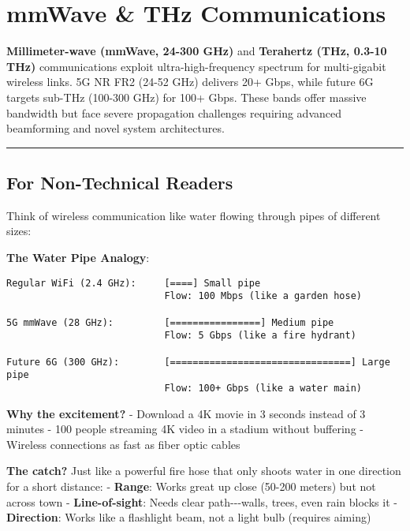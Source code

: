\section{mmWave \& THz Communications}\label{mmwave-thz-communications}

\textbf{Millimeter-wave (mmWave, 24-300 GHz)} and \textbf{Terahertz
(THz, 0.3-10 THz)} communications exploit ultra-high-frequency spectrum
for multi-gigabit wireless links. 5G NR FR2 (24-52 GHz) delivers 20+
Gbps, while future 6G targets sub-THz (100-300 GHz) for 100+ Gbps. These
bands offer massive bandwidth but face severe propagation challenges
requiring advanced beamforming and novel system architectures.

\begin{center}\rule{0.5\linewidth}{0.5pt}\end{center}

\subsection{\texorpdfstring{ For Non-Technical
Readers}{ For Non-Technical Readers}}\label{for-non-technical-readers}

Think of wireless communication like water flowing through pipes of
different sizes:

\textbf{The Water Pipe Analogy}:

\begin{verbatim}
Regular WiFi (2.4 GHz):     [====] Small pipe
                            Flow: 100 Mbps (like a garden hose)

5G mmWave (28 GHz):         [================] Medium pipe
                            Flow: 5 Gbps (like a fire hydrant)

Future 6G (300 GHz):        [================================] Large pipe
                            Flow: 100+ Gbps (like a water main)
\end{verbatim}

\textbf{Why the excitement?} - Download a 4K movie in 3 seconds instead
of 3 minutes - 100 people streaming 4K video in a stadium without
buffering - Wireless connections as fast as fiber optic cables

\textbf{The catch?} Just like a powerful fire hose that only shoots
water in one direction for a short distance: - \textbf{Range}: Works
great up close (50-200 meters) but not across town -
\textbf{Line-of-sight}: Needs clear path-\/-\/-walls, trees, even rain
blocks it - \textbf{Direction}: Works like a flashlight beam, not a
light bulb (requires aiming)

